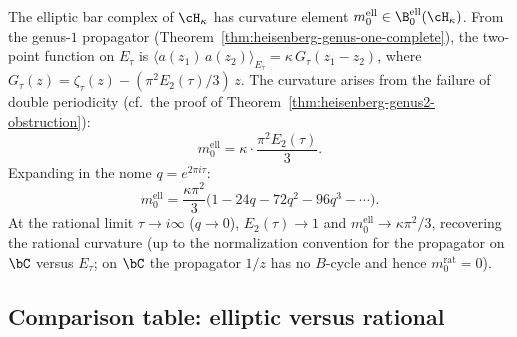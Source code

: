 \begin{computation}\label{comp:ell-curvature}
The elliptic bar complex of $\cH_\kappa$ has curvature
element $m_0^{\mathrm{ell}} \in \B^{\mathrm{ell}}_0(\cH_\kappa)$.
From the genus-$1$ propagator
(Theorem~\ref{thm:heisenberg-genus-one-complete}), the
two-point function on $E_\tau$ is $\langle a(z_1)\,a(z_2)
\rangle_{E_\tau} = \kappa\,G_\tau(z_1 - z_2)$, where
$G_\tau(z) = \zeta_\tau(z) - (\pi^2 E_2(\tau)/3)\,z$.
The curvature arises from the failure of double periodicity
(cf.\ the proof of
Theorem~\ref{thm:heisenberg-genus2-obstruction}):
\begin{equation}\label{eq:ell-curvature}
m_0^{\mathrm{ell}}
= \kappa \cdot \frac{\pi^2 E_2(\tau)}{3}.
\end{equation}
Expanding in the nome $q = e^{2\pi i \tau}$:
\begin{equation}\label{eq:ell-curvature-q}
m_0^{\mathrm{ell}}
= \frac{\kappa\pi^2}{3}\bigl(
1 - 24q - 72q^2 - 96q^3 - \cdots
\bigr).
\end{equation}
At the rational limit $\tau \to i\infty$ ($q \to 0$),
$E_2(\tau) \to 1$ and $m_0^{\mathrm{ell}} \to
\kappa\pi^2/3$, recovering the rational curvature
(up to the normalization convention for the propagator
on $\bC$ versus $E_\tau$; on $\bC$ the propagator
$1/z$ has no $B$-cycle and hence $m_0^{\mathrm{rat}} = 0$).
\end{computation}

\subsection{Comparison table: elliptic versus rational}
\label{subsec:ell-vs-rat-table}

